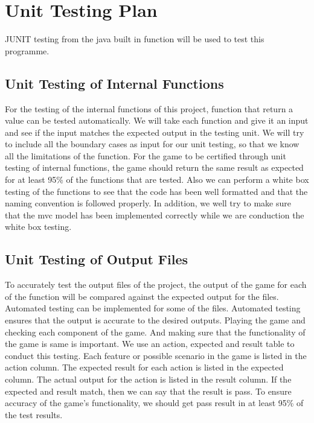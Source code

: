 \documentclass[12pt,letterpaper]{article}
\begin{document}
	\section{Unit Testing Plan}
	JUNIT testing from the java built in function will be used to test this programme.
	\subsection{Unit Testing of Internal Functions}
	 For the testing of the internal functions of this project, function that return a value can be tested automatically. We will take each function and give it an input and see if the input matches the expected output in the testing unit. We will try to include all the boundary cases as input for our unit testing, so that we know all the limitations of the function. For the game to be certified through unit testing of internal functions, the game should return the same result as expected for at least 95\% of the functions that are tested. Also we can perform a white box testing of the functions to see that the code has been well formatted and that the naming convention is followed properly. In addition, we well try to make sure that the mvc model has been implemented correctly while we are conduction the white box testing.
	\subsection{Unit Testing of Output Files}
	To accurately test the output files of the project, the output of the game for each of the function will be compared against the expected output for the files. Automated testing can be implemented for some of the files. Automated testing ensures that the output is accurate to the desired outputs. Playing the game and checking each component of the game. And making sure that the functionality of the game is same is important. We use an action, expected and result table to conduct this testing. Each feature or possible scenario in the game is listed in the action column. The expected result for each action is listed in the expected column. The actual output for the action is listed in the result column. If the expected and result match, then we can say that the result is pass. To ensure accuracy of the game’s functionality, we should get pass result in at least 95\% of the test results.
\end{document}
